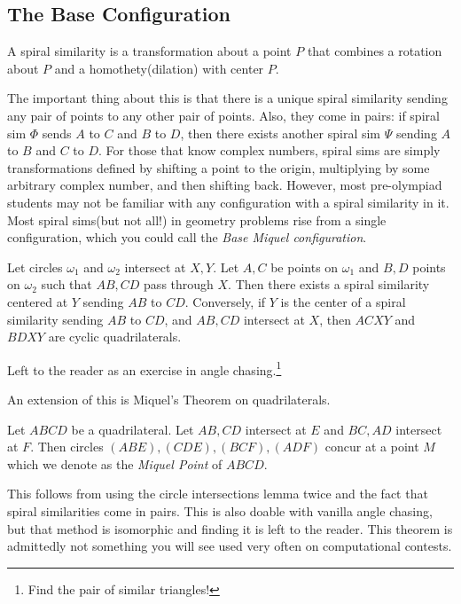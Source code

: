 \documentclass[mast]{lucky}
\begin{document}
\subsection{The Base Configuration}
\begin{defi}

A spiral similarity is a transformation about a point $P$ that combines a rotation about $P$ and a homothety(dilation) with center $P$. 
\end{defi}
The important thing about this is that there is a unique spiral similarity sending any pair of points to any other pair of points. Also, they come in pairs: if spiral sim $\Phi$ sends $A$ to $C$ and $B$ to $D$, then there exists another spiral sim $\Psi$ sending $A$ to $B$ and $C$ to $D$. For those that know complex numbers, spiral sims are simply transformations defined by shifting a point to the origin, multiplying by some arbitrary complex number, and then shifting back. However, most pre-olympiad students may not be familiar with any configuration with a spiral similarity in it. Most spiral sims(but not all!) in geometry problems rise from a single configuration, which you could call the \textit{Base Miquel configuration}.
\begin{theo}
Let circles $\omega_1$ and $\omega_2$ intersect at $X,Y$. Let $A,C$ be points on $\omega_1$ and $B,D$ points on $\omega_2$ such that $AB,CD$ pass through $X$. Then there exists a spiral similarity centered at $Y$ sending $AB$ to $CD$. Conversely, if $Y$ is the center of a spiral similarity sending $AB$ to $CD$, and $AB,CD$ intersect at $X$, then $ACXY$ and $BDXY$ are cyclic quadrilaterals.
\end{theo}
\begin{pro}
Left to the reader as an exercise in angle chasing.\footnote{Find the pair of similar triangles!}
\end{pro}
An extension of this is Miquel's Theorem on quadrilaterals.
\begin{theo}
Let $ABCD$ be a quadrilateral. Let $AB,CD$ intersect at $E$ and $BC, AD$ intersect at $F$. Then circles $(ABE),(CDE),(BCF),(ADF)$ concur at a point $M$ which we denote as the \textit{Miquel Point} of $ABCD$.
\end{theo}
\begin{pro}
This follows from using the circle intersections lemma twice and the fact that spiral similarities come in pairs. This is also doable with vanilla angle chasing, but that method is isomorphic and finding it is left to the reader. This theorem is admittedly not something you will see used very often on computational contests.
\end{pro}
\end{document}
